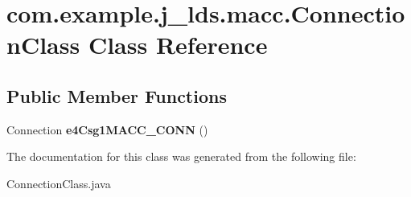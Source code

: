 \hypertarget{classcom_1_1example_1_1j__lds_1_1macc_1_1_connection_class}{}\section{com.\+example.\+j\+\_\+lds.\+macc.\+Connection\+Class Class Reference}
\label{classcom_1_1example_1_1j__lds_1_1macc_1_1_connection_class}
\subsection*{Public Member Functions}
\begin{DoxyCompactItemize}
\item 
\mbox{\label{classcom_1_1example_1_1j__lds_1_1macc_1_1_connection_class_a8062c1d9a0755d76fe2eab4abf78bcd9}} 
Connection {\bfseries e4\+Csg1\+M\+A\+C\+C\+\_\+\+C\+O\+NN} ()
\end{DoxyCompactItemize}


The documentation for this class was generated from the following file\+:\begin{DoxyCompactItemize}
\item 
Connection\+Class.\+java\end{DoxyCompactItemize}
